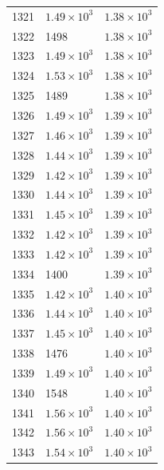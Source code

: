\begin{table}[H]
\begin{tabular}{lll}
1321 & $\displaystyle 1.49 \times 10^{3}$ & $\displaystyle 1.38 \times 10^{3}$ \\
1322 & 1498 & $\displaystyle 1.38 \times 10^{3}$ \\
1323 & $\displaystyle 1.49 \times 10^{3}$ & $\displaystyle 1.38 \times 10^{3}$ \\
1324 & $\displaystyle 1.53 \times 10^{3}$ & $\displaystyle 1.38 \times 10^{3}$ \\
1325 & 1489 & $\displaystyle 1.38 \times 10^{3}$ \\
1326 & $\displaystyle 1.49 \times 10^{3}$ & $\displaystyle 1.39 \times 10^{3}$ \\
1327 & $\displaystyle 1.46 \times 10^{3}$ & $\displaystyle 1.39 \times 10^{3}$ \\
1328 & $\displaystyle 1.44 \times 10^{3}$ & $\displaystyle 1.39 \times 10^{3}$ \\
1329 & $\displaystyle 1.42 \times 10^{3}$ & $\displaystyle 1.39 \times 10^{3}$ \\
1330 & $\displaystyle 1.44 \times 10^{3}$ & $\displaystyle 1.39 \times 10^{3}$ \\
1331 & $\displaystyle 1.45 \times 10^{3}$ & $\displaystyle 1.39 \times 10^{3}$ \\
1332 & $\displaystyle 1.42 \times 10^{3}$ & $\displaystyle 1.39 \times 10^{3}$ \\
1333 & $\displaystyle 1.42 \times 10^{3}$ & $\displaystyle 1.39 \times 10^{3}$ \\
1334 & 1400 & $\displaystyle 1.39 \times 10^{3}$ \\
1335 & $\displaystyle 1.42 \times 10^{3}$ & $\displaystyle 1.40 \times 10^{3}$ \\
1336 & $\displaystyle 1.44 \times 10^{3}$ & $\displaystyle 1.40 \times 10^{3}$ \\
1337 & $\displaystyle 1.45 \times 10^{3}$ & $\displaystyle 1.40 \times 10^{3}$ \\
1338 & 1476 & $\displaystyle 1.40 \times 10^{3}$ \\
1339 & $\displaystyle 1.49 \times 10^{3}$ & $\displaystyle 1.40 \times 10^{3}$ \\
1340 & 1548 & $\displaystyle 1.40 \times 10^{3}$ \\
1341 & $\displaystyle 1.56 \times 10^{3}$ & $\displaystyle 1.40 \times 10^{3}$ \\
1342 & $\displaystyle 1.56 \times 10^{3}$ & $\displaystyle 1.40 \times 10^{3}$ \\
1343 & $\displaystyle 1.54 \times 10^{3}$ & $\displaystyle 1.40 \times 10^{3}$ \\

\end{tabular}
\end{table}
